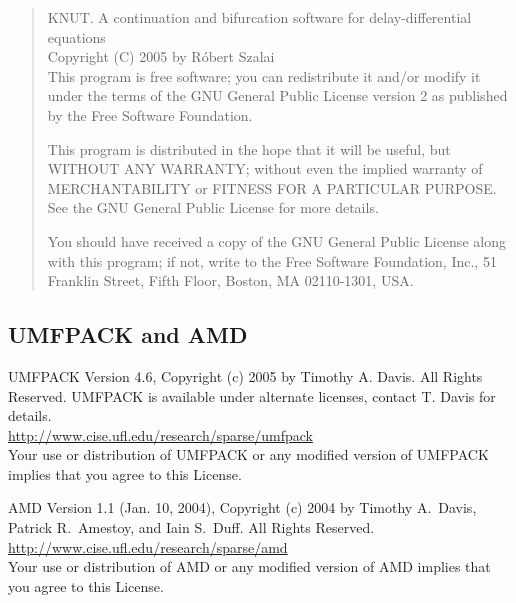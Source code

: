 \documentclass[10pt,a4paper]{ddedoc}
\begin{document}
\begin{quote}
KNUT. A continuation and bifurcation software for delay-differential
equations \\
Copyright (C) 2005 by R\'obert Szalai \\

This program is free software; you can redistribute it and/or modify
it under the terms of the GNU General Public License version 2 as published by
the Free Software Foundation.

This program is distributed in the hope that it will be useful,
but WITHOUT ANY WARRANTY; without even the implied warranty of
MERCHANTABILITY or FITNESS FOR A PARTICULAR PURPOSE.  See the
GNU General Public License for more details.

You should have received a copy of the GNU General Public License
along with this program; if not, write to the Free Software
Foundation, Inc., 51 Franklin Street, Fifth Floor, Boston, MA  02110-1301, USA.
\end{quote}

\subsection{UMFPACK and AMD}

\noindent
UMFPACK Version 4.6, Copyright (c) 2005 by Timothy A. Davis.
All Rights Reserved.
UMFPACK is available under alternate licenses, contact T. Davis for details.\\
\url{http://www.cise.ufl.edu/research/sparse/umfpack}\\
Your use or distribution of UMFPACK or any modified version of
UMFPACK implies that you agree to this License.

\noindent
AMD Version 1.1 (Jan. 10, 2004),
Copyright (c) 2004 by Timothy A.~Davis, Patrick R.~Amestoy, and Iain S.~Duff.
All Rights Reserved.\\
\url{http://www.cise.ufl.edu/research/sparse/amd}\\
Your use or distribution of AMD or any modified version of
AMD implies that you agree to this License.
\end{document}
